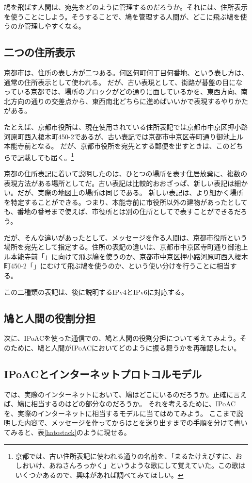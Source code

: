 鳩を飛ばす人間は、宛先をどのように管理するのだろうか。それには、住所表示を使うことにしよう。そうすることで、鳩を管理する人間が、どこに飛ぶ鳩を使うのか管理しやすくなる。

\subsection{二つの住所表示}

京都市は、住所の表し方が二つある。何区何町何丁目何番地、という表し方は、通常の住所表示として使われる。
だが、古い表現として、街路が碁盤の目になっている京都では、場所のブロックがどの通りに面しているかを、東西方向、南北方向の通りの交差点から、東西南北どちらに進めばいいかで表現するやりかたがある。

たとえば、京都市役所は、現在使用されている住所表記では京都市中京区押小路河原町西入榎木町450-2であるが、古い表記では京都市中京区寺町通り御池上ル本能寺前となる。
だが、京都市役所を宛先とする郵便を出すときは、このどちらで記載しても届く。\footnote{京都では、古い住所表記に使われる通りの名前を、「まるたけえびすに、おしおいけ、あねさんろっかく」というような歌にして覚えていた。この歌はいくつかあるので、興味があれば調べてみてほしい。}

京都の住所表記に着いて説明したのは、ひとつの場所を表す住居放棄に、複数の表現方法がある場所としてだ。古い表記は比較的おおざっぱ、新しい表記は細かい。だが、実際の地図上の場所は同じである。
新しい表記は、より細かく場所を特定することができる。つまり、本能寺前に市役所以外の建物があったとしても、番地の番号まで使えば、市役所とは別の住所としてで表すことができるだろう。

だが、そんな違いがあったとして、メッセージを作る人間は、京都市役所という場所を宛先として指定する。住所の表記の違いは、京都市中京区寺町通り御池上ル本能寺前「」に向けて飛ぶ鳩を使うのか、京都市中京区押小路河原町西入榎木町450-2「」にむけて飛ぶ鳩を使うのか、という使い分けを行うことに相当する。

この二種類の表記は、後に説明するIPv4とIPv6に対応する。



\subsection{鳩と人間の役割分担}
次に、IPoACを使った通信での、鳩と人間の役割分担について考えてみよう。そのために、鳩と人間がIPoACにおいてどのように振る舞うかを再確認したい。





\subsection{IPoACとインターネットプロトコルモデル}
では、実際のインターネットにおいて、鳩はどこにいるのだろうか。正確に言えば、鳩に相当するのはどの部分なのだろうか。
それを考えるために、IPoACを、実際のインターネットに相当するモデルに当てはめてみよう。
ここまで説明した内容で、メッセージを作ってからはとを送り出すまでの手順を分けて書いてみると、表\ref{hatostack}のように現せる。

